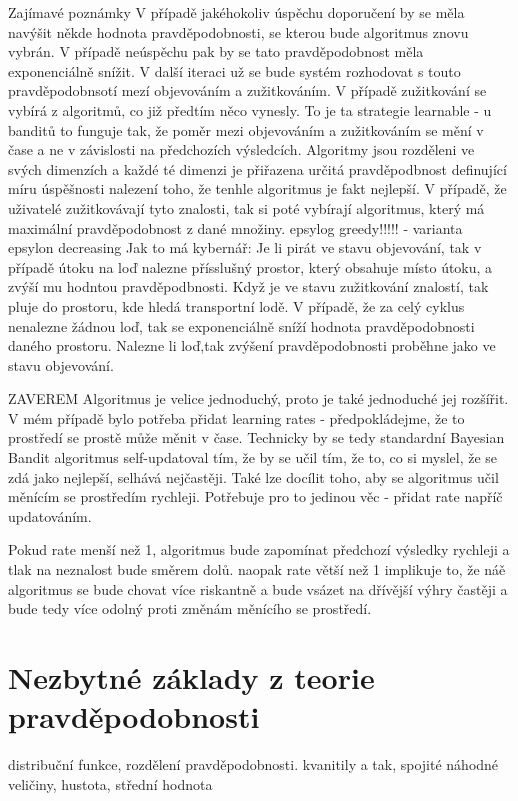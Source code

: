 \documentclass[thesis=M,czech]{FITthesis}[2014/05/07]
\begin{document}
Zajímavé poznámky
V případě jakéhokoliv úspěchu doporučení by se měla navýšit někde hodnota pravděpodobnosti, se kterou bude algoritmus znovu vybrán. V případě neúspěchu pak by se tato pravděpodobnost měla exponenciálně snížit. V další iteraci už se bude systém rozhodovat s touto pravděpodobnsotí mezí objevováním a zužitkováním. V případě zužitkování se vybírá z algoritmů, co již předtím něco vynesly. To je ta strategie learnable - u banditů to funguje tak, že poměr mezi objevováním a zužitkováním se mění v čase a ne v závislosti na předchozích výsledcích. Algoritmy jsou rozděleni ve svých dimenzích a každé té dimenzi je přiřazena určitá pravděpodbnost definující míru úspěšnosti nalezení toho, že tenhle algoritmus je fakt nejlepší. V případě, že uživatelé zužitkovávají tyto znalosti, tak si poté vybírají algoritmus, který má maximální pravděpodobnost z dané množiny. 
epsylog greedy!!!!! - varianta  epsylon decreasing
Jak to má kybernář: Je li pirát ve stavu objevování, tak v případě útoku na loď nalezne přísslušný prostor, který obsahuje místo útoku, a zvýší mu hodntou pravděpodbnosti. Když je ve stavu zužitkování znalostí, tak pluje do prostoru, kde hledá transportní lodě. V případě, že za celý cyklus nenalezne žádnou loď, tak se exponenciálně sníží hodnota pravděpodobnosti daného prostoru. Nalezne li loď,tak zvýšení pravděpodobnosti proběhne jako ve stavu objevování. 


ZAVEREM
Algoritmus je velice jednoduchý, proto je také jednoduché jej rozšířit. V mém případě bylo potřeba přidat learning rates - předpokládejme, že to prostředí se prostě může měnit v čase. Technicky by se tedy standardní Bayesian Bandit algoritmus self-updatoval tím, že by se učil tím, že to, co si myslel, že se zdá jako nejlepší, selhává nejčastěji. Také lze docílit toho, aby se algoritmus učil měnícím se prostředím rychleji. Potřebuje pro to jedinou věc - přidat rate napříč updatováním.

Pokud rate menší než 1, algoritmus bude zapomínat předchozí výsledky rychleji a tlak na neznalost bude směrem dolů. naopak rate větší než 1 implikuje to, že náě algoritmus se bude chovat více riskantně a bude vsázet na dřívější výhry častěji a bude tedy více odolný proti změnám měnícího se prostředí.

\section{Nezbytné základy z teorie pravděpodobnosti}

distribuční funkce, rozdělení pravděpodobnosti. kvanitily a tak, spojité náhodné veličiny, hustota, střední hodnota
		
\end{document}
